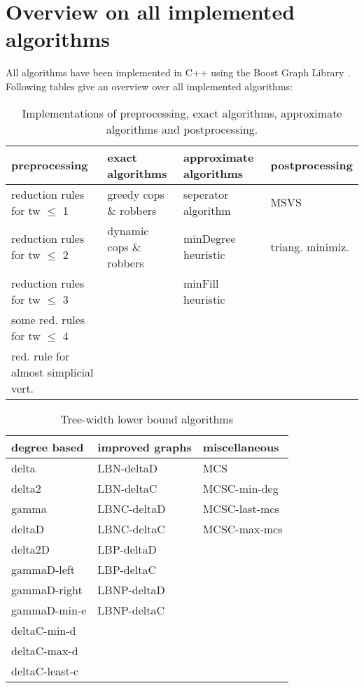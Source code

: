 \documentclass[a4wide]{article}
\begin{document}
\newpage

\tableofcontents

\section{Overview on all implemented algorithms}

All algorithms have been implemented in C++ using the Boost Graph Library \cite{boost}. Following tables give an overview over all implemented algorithms:\\

\begin{table}[h!]
\small
\begin{tabular}{l|l|l|l}
preprocessing & exact algorithms & approximate algorithms & postprocessing \\
\hline
\hline
reduction rules for tw $\leq$ 1 & greedy cops \& robbers & seperator algorithm & MSVS\\
reduction rules for tw $\leq$ 2 & dynamic cops \& robbers & minDegree heuristic & triang. minimiz.\\
reduction rules for tw $\leq$ 3  & & minFill heuristic \\
some red. rules for tw $\leq$ 4 & & \\
red. rule for almost simplicial vert. & & \\
\hline
\end{tabular}
\normalsize
\caption{Implementations of preprocessing, exact algorithms, approximate algorithms and postprocessing.}
\end{table}

\vspace*{5mm}

\begin{table}[h!]
\begin{tabular}{|l|l|l|}
\hline
degree based & improved graphs & miscellaneous \\
\hline
\hline
delta & LBN-deltaD & MCS \\
delta2 & LBN-deltaC & MCSC-min-deg \\
gamma & LBNC-deltaD & MCSC-last-mcs \\
deltaD & LBNC-deltaC & MCSC-max-mcs \\
delta2D & LBP-deltaD &\\
gammaD-left & LBP-deltaC &\\
gammaD-right & LBNP-deltaD &\\
gammaD-min-e & LBNP-deltaC &\\
deltaC-min-d &&\\
deltaC-max-d &&\\
deltaC-least-c &&\\
\hline
\end{tabular}
\caption{Tree-width lower bound algorithms}
\end{table}
\end{document}
